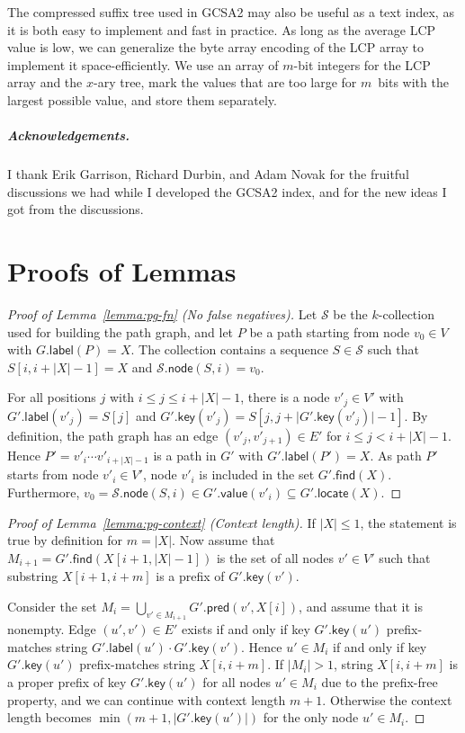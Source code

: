 \documentclass[a4paper,UKenglish]{lipics-v2016}
\newcommand{\abs}[1]{\ensuremath{\lvert #1 \rvert}}
\newcommand{\find}{\ensuremath{\mathsf{find}}}
\newcommand{\locate}{\ensuremath{\mathsf{locate}}}
\newcommand{\glabel}{\ensuremath{\mathsf{label}}}
\newcommand{\gpred}{\ensuremath{\mathsf{pred}}}
\newcommand{\gkey}{\ensuremath{\mathsf{key}}}
\newcommand{\gvalue}{\ensuremath{\mathsf{value}}}
\newcommand{\gnode}{\ensuremath{\mathsf{node}}}
\newcommand{\kcollection}[1]{$#1$\nobreakdash-collection}
\begin{document}
The compressed suffix tree used in GCSA2 may also be useful as a text index, as it is both easy to implement and fast in practice. As long as the average LCP value is low, we can generalize the byte array encoding of the LCP array \cite{Abouelhoda2004} to implement it space-efficiently. We use an array of $m$\nobreakdash-bit integers for the LCP array and the $x$\nobreakdash-ary tree, mark the values that are too large for $m$~bits with the largest possible value, and store them separately.


\subparagraph*{Acknowledgements.}

I thank Erik Garrison, Richard Durbin, and Adam Novak for the fruitful discussions we had while I developed the GCSA2 index, and for the new ideas I got from the discussions.





\clearpage
\appendix
\section{Proofs of Lemmas}\label{appendix:proofs}

\begin{proof}[Proof of Lemma~\ref{lemma:pg-fn} (No false negatives)]
Let $\mathcal{S}$ be the \kcollection{k} used for building the path graph, and let $P$ be a path starting from node $v_{0} \in V$ with $G.\glabel(P) = X$. The collection contains a sequence $S \in \mathcal{S}$ such that $S[i, i+\abs{X}-1] = X$ and $\mathcal{S}.\gnode(S, i) = v_{0}$.

For all positions $j$ with $i \le j \le i+\abs{X}-1$, there is a node $v'_{j} \in V'$ with $G'.\glabel(v'_{j}) = S[j]$ and $G'.\gkey(v'_{j}) = S[j, j+\abs{G'.\gkey(v'_{j})}-1]$.
By definition, the path graph has an edge $(v'_{j}, v'_{j+1}) \in E'$ for $i \le j < i+\abs{X}-1$.
Hence $P' = v'_{i} \dotsm v'_{i+\abs{X}-1}$ is a path in $G'$ with $G'.\glabel(P') = X$.
As path $P'$ starts from node $v'_{i} \in V'$, node $v'_{i}$ is included in the set $G'.\find(X)$.
Furthermore, $v_{0} = \mathcal{S}.\gnode(S, i) \in G'.\gvalue(v'_{i}) \subseteq G'.\locate(X)$.
\end{proof}

\begin{proof}[Proof of Lemma~\ref{lemma:pg-context} (Context length)]
If $\abs{X} \le 1$, the statement is true by definition for $m = \abs{X}$. Now assume that $M_{i+1} = G'.\find(X[i+1, \abs{X}-1])$ is the set of all nodes $v' \in V'$ such that substring $X[i+1, i+m]$ is a prefix of $G'.\gkey(v')$.

Consider the set $M_{i} = \bigcup_{v' \in M_{i+1}} G'.\gpred(v', X[i])$, and assume that it is nonempty. Edge $(u', v') \in E'$ exists if and only if key $G'.\gkey(u')$ prefix-matches string $G'.\glabel(u') \cdot G'.\gkey(v')$. Hence $u' \in M_{i}$ if and only if key $G'.\gkey(u')$ prefix-matches string $X[i, i+m]$. If $\abs{M_{i}} > 1$, string $X[i, i+m]$ is a proper prefix of key $G'.\gkey(u')$ for all nodes $u' \in M_{i}$ due to the prefix-free property, and we can continue with context length $m+1$. Otherwise the context length becomes $\min(m+1, \abs{G'.\gkey(u')})$ for the only node $u' \in M_{i}$.
\end{proof}
\end{document}
